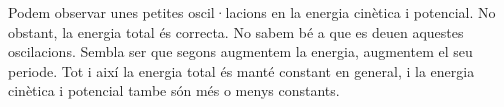 \documentclass{article}
\begin{document}
Podem observar unes petites oscil·lacions en la energia cinètica i potencial. No obstant, la energia total és correcta. No sabem bé a que es deuen aquestes oscilacions. Sembla ser que segons augmentem la energia, augmentem el seu periode. Tot i així la energia total és manté constant en general, i la energia cinètica i potencial tambe són més o menys constants. 
\end{document}
